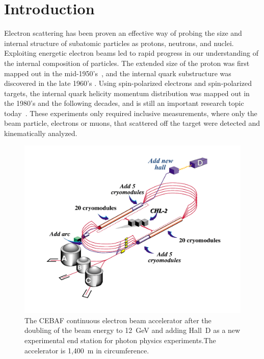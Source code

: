 \documentclass[final,3p,twocolumn]{elsarticle}
\begin{document}
\linenumbers
\section{Introduction}

Electron scattering has been proven an effective way of probing the size and internal structure of subatomic
particles as protons, neutrons, and nuclei. Exploiting energetic electron beams led to rapid progress in our
understanding of the internal composition of particles. The extended size of the proton was first mapped out in
the mid-1950's~\cite{Mcallister:1956ng}, and the internal quark substructure was discovered in the late 1960's
\cite{Breidenbach:1969kd}. Using spin-polarized electrons and spin-polarized targets, the internal quark helicity
momentum distribution was mapped out in the 1980's and the following decades, and is still an important research
topic today~\cite{Kuhn:2008sy}. These experiments only required inclusive measurements, where only the beam
particle, electrons or muons, that scattered off the target were detected and kinematically analyzed.  

\begin{figure}[ht]
\centerline{\includegraphics[width=1.8\columnwidth]{cebaf.pdf}}
\caption{The CEBAF continuous electron beam accelerator after the doubling of the beam energy to 12~GeV and 
adding Hall~D as a new experimental end station for photon physics experiments.The accelerator is 1,400~m in
circumference.}
\label{cebaf12}
\end{figure} 
\end{document}

